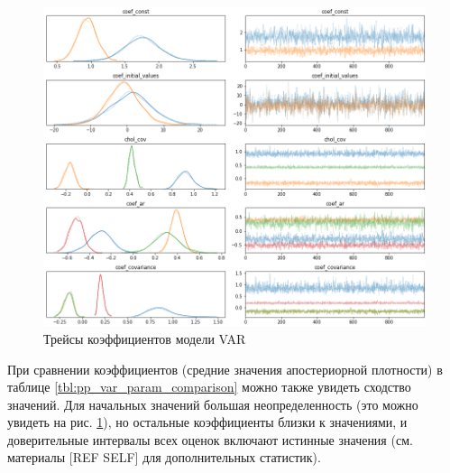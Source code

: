 \documentclass[a4paper,14pt]{extreport}
\begin{document}
\begin{figure}[H]
	\includegraphics[width=\linewidth]{img/gen/pp_var_trace.png}
	\caption{Трейсы коэффициентов модели VAR}
	\label{fig:pp_var_trace}
\end{figure}

При сравнении коэффициентов (средние значения апостериорной плотности) в таблице \ref{tbl:pp_var_param_comparison} можно также увидеть сходство значений. Для начальных значений большая неопределенность (это можно увидеть на рис. \ref{fig:pp_var_trace}), но остальные коэффициенты близки к значениями, и доверительные интервалы всех оценок включают истинные значения (см. материалы [REF SELF] для дополнительных статистик).
\end{document}
